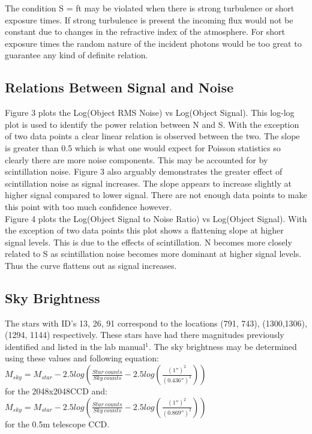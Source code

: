 \documentclass{article}
\begin{document}
The condition S = ft may be violated when there is strong turbulence or short exposure times. If strong turbulence is present the incoming flux would not be constant due to changes in the refractive index of the atmosphere. For short exposure times the random nature of the incident photons would be too great to guarantee any kind of definite relation.

\subsection{Relations Between Signal and Noise}
Figure 3 plots the Log(Object RMS Noise) vs Log(Object Signal). This log-log plot is used to identify the power relation between N and S. With the exception of two data points a clear linear relation is observed between the two. The slope is greater than 0.5 which is what one would expect for Poisson statistics so clearly there are more noise components. This may be accounted for by scintillation noise. Figure 3 also arguably demonstrates the greater effect of scintillation noise as signal increases. The slope appears to increase slightly at higher signal compared to lower signal. There are not enough data points to make this point with too much confidence however.\\

Figure 4 plots the Log(Object Signal to Noise Ratio) vs Log(Object Signal). With the exception of two data points this plot shows a flattening slope at higher signal levels. This is due to the effects of scintillation. N becomes more closely related to S as scintillation noise becomes more dominant at higher signal levels. Thus the curve flattens out as signal increases.

\subsection{Sky Brightness}
The stars with ID's 13, 26, 91 correspond to the locations (791, 743), (1300,1306), (1294, 1144) respectively. These stars have had there magnitudes previously identified and listed in the lab manual$^1$. The sky brightness may be determined using these values and following equation:\\

$M_{sky}=M_{star}-2.5log(\frac{Star\ counts}{Sky\ counts}-2.5log(\frac{(1'')^2}{(0.436'')^2}))$\\
for the 2048x2048CCD and:\\

$M_{sky}=M_{star}-2.5log(\frac{Star\ counts}{Sky\ counts}-2.5log(\frac{(1'')^2}{(0.869'')^2}))$\\
for the 0.5m telescope CCD.\\
\end{document}
